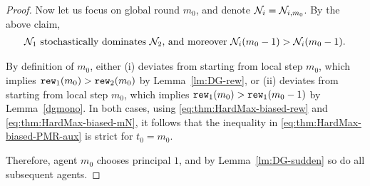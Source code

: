 \begin{proof}
Now let us focus on global round $m_0$, and denote $\mathcal{N}_i = \mathcal{N}_{i,m_0}$.  By the above claim,
\begin{align}\label{eq:thm:HardMax-biased-mN}
\text{$\mathcal{N}_1$ stochastically dominates $\mathcal{N}_2$, and moreover
    $\mathcal{N}_i(m_0-1)>\mathcal{N}_i(m_0-1)$.}
\end{align}

By definition of $m_0$, either (i) \alg[2] deviates from \DynGreedy starting from local step $m_0$, which implies $\mathtt{rew}_1(m_0)> \mathtt{rew}_2(m_0)$ by Lemma~\ref{lm:DG-rew}, or (ii) \DynGreedy deviates from \StaticGreedy starting from local step $m_0$, which implies $\mathtt{rew}_1(m_0)>\mathtt{rew}_1(m_0-1)$ by Lemma~\ref{dgmono}. In both cases, using \eqref{eq:thm:HardMax-biased-rew} and \eqref{eq:thm:HardMax-biased-mN}, it follows that the inequality in \eqref{eq:thm:HardMax-biased-PMR-aux} is strict for $t_0=m_0$.

Therefore, agent $m_0$ chooses principal $1$, and by Lemma~\ref{lm:DG-sudden} so do all subsequent agents.
\end{proof}


%




